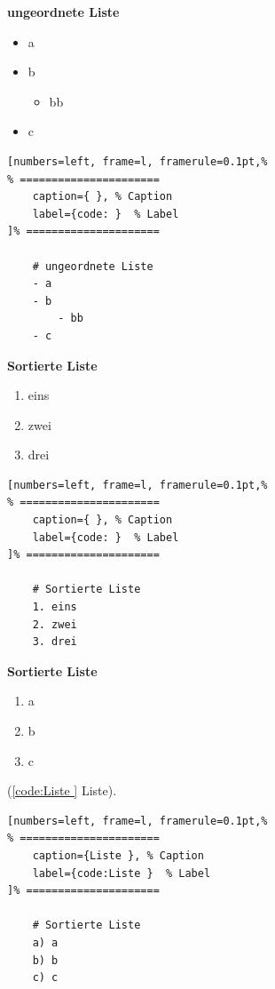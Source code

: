 \textbf{ungeordnete Liste}

\begin{itemize}%
\item
  a
\item
  b

  \begin{itemize}%
  \item
    bb
  \end{itemize}
\item
  c
\end{itemize}

\lstset{language=Bash} %
\begin{lstlisting}[numbers=left, frame=l, framerule=0.1pt,%
% ======================
	caption={ }, % Caption
	label={code: }  % Label
]% =====================

    # ungeordnete Liste
    - a
    - b
        - bb
    - c
\end{lstlisting}

\textbf{Sortierte Liste}

\begin{enumerate}%
\item
  eins
\item
  zwei
\item
  drei
\end{enumerate}

\lstset{language=Bash} %
\begin{lstlisting}[numbers=left, frame=l, framerule=0.1pt,%
% ======================
	caption={ }, % Caption
	label={code: }  % Label
]% =====================

    # Sortierte Liste
    1. eins
    2. zwei
    3. drei
\end{lstlisting}

\textbf{Sortierte Liste}

\begin{enumerate}%
\def\labelenumi{\alph{enumi})}
\item
  a
\item
  b
\item
  c
\end{enumerate}

(\autoref{code:Liste } Liste). %

\lstset{language=Bash} %
\begin{lstlisting}[numbers=left, frame=l, framerule=0.1pt,%
% ======================
	caption={Liste }, % Caption
	label={code:Liste }  % Label
]% =====================

    # Sortierte Liste
    a) a
    b) b
    c) c
\end{lstlisting}

